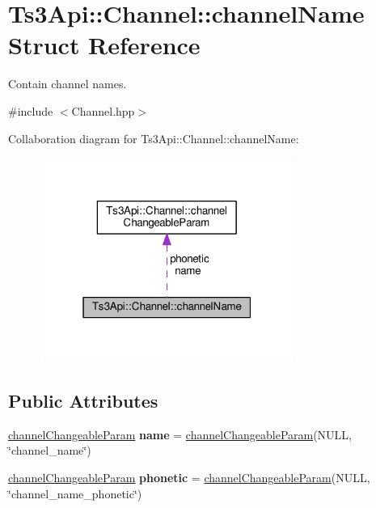 \hypertarget{struct_ts3_api_1_1_channel_1_1channel_name}{}\section{Ts3\+Api\+:\+:Channel\+:\+:channel\+Name Struct Reference}
\label{struct_ts3_api_1_1_channel_1_1channel_name}


Contain channel names.  




{\ttfamily \#include $<$Channel.\+hpp$>$}



Collaboration diagram for Ts3\+Api\+:\+:Channel\+:\+:channel\+Name\+:\nopagebreak
\begin{figure}[H]
\begin{center}
\leavevmode
\includegraphics[width=235pt]{struct_ts3_api_1_1_channel_1_1channel_name__coll__graph}
\end{center}
\end{figure}
\subsection*{Public Attributes}
\begin{DoxyCompactItemize}
\item 
\hyperlink{struct_ts3_api_1_1_channel_1_1channel_changeable_param}{channel\+Changeable\+Param} {\bfseries name} = \hyperlink{struct_ts3_api_1_1_channel_1_1channel_changeable_param}{channel\+Changeable\+Param}(N\+U\+LL, \char`\"{}channel\+\_\+name\char`\"{})\hypertarget{struct_ts3_api_1_1_channel_1_1channel_name_af32e3a8d14c7751cd56457792f4833ac}{}\label{struct_ts3_api_1_1_channel_1_1channel_name_af32e3a8d14c7751cd56457792f4833ac}

\item 
\hyperlink{struct_ts3_api_1_1_channel_1_1channel_changeable_param}{channel\+Changeable\+Param} {\bfseries phonetic} = \hyperlink{struct_ts3_api_1_1_channel_1_1channel_changeable_param}{channel\+Changeable\+Param}(N\+U\+LL, \char`\"{}channel\+\_\+name\+\_\+phonetic\char`\"{})\hypertarget{struct_ts3_api_1_1_channel_1_1channel_name_a8e4cfbfed9c1481bddfd5cb1a69b44d0}{}\label{struct_ts3_api_1_1_channel_1_1channel_name_a8e4cfbfed9c1481bddfd5cb1a69b44d0}

\end{DoxyCompactItemize}


